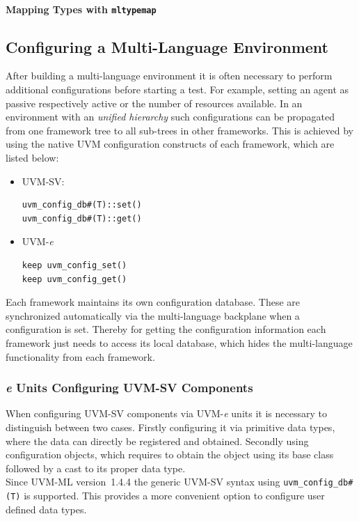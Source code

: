 \paragraph{Mapping Types with \lstinline$mltypemap$} \label{mapping_mltypemap}
\subsection{Configuring a Multi-Language Environment} \label{ml_config}
After building a multi-language environment it is often necessary to perform additional configurations before starting a
test. For example, setting an agent as passive respectively active or the number of resources available. In an
environment with an \emph{unified hierarchy} such configurations can be propagated from one framework tree
to all sub-trees in other frameworks. This is achieved by using the native UVM configuration constructs of each
framework, which are listed below:
\begin{itemize}
\item{UVM-SV:}
{}
\begin{lstlisting}
uvm_config_db#(T)::set()
uvm_config_db#(T)::get()
\end{lstlisting} 

\item{UVM-\textit{e}}
{}
\begin{lstlisting}
keep uvm_config_set()
keep uvm_config_get()
\end{lstlisting} 
\end{itemize}

Each framework maintains its own configuration database. These are synchronized automatically via the multi-language
backplane when a configuration is set. Thereby for getting the configuration information each framework just needs to
access its local database, which hides the multi-language functionality from each framework.

\subsubsection{\textit{e} Units Configuring UVM-SV Components}\label{e_config_sv}

When configuring UVM-SV components via UVM-\textit{e} units it is necessary to distinguish between two cases. Firstly
configuring it via primitive data types, where the data can directly be registered and obtained. Secondly using
configuration objects, which requires to obtain the object using its base class followed by a cast to its proper data
type.\\
Since UVM-ML version~1.4.4 the generic UVM-SV syntax using \lstinline$uvm_config_db#(T)$ is supported. This
provides a more convenient option to configure user defined data types. 

